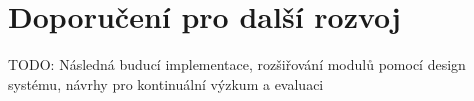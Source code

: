 \chapter{Doporučení pro další rozvoj}

TODO: Následná buducí implementace, rozšiřování modulů pomocí design systému, návrhy pro kontinuální výzkum a evaluaci

